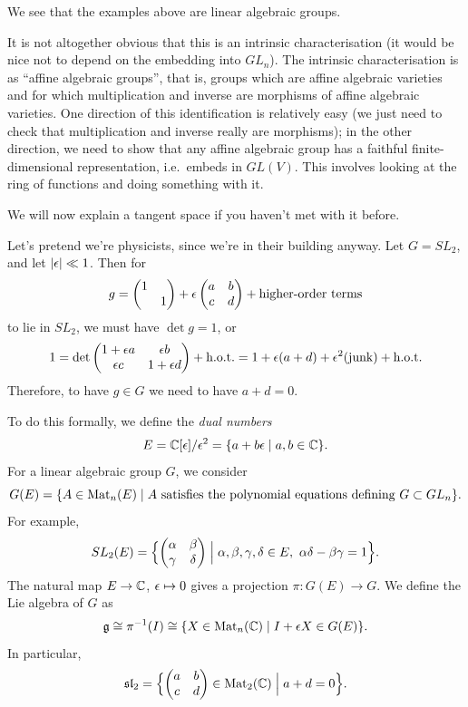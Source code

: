 We see that the examples above are linear algebraic groups.

\begin{remark}
It is not altogether obvious that this is an intrinsic characterisation (it
would be nice not to depend on the embedding into $GL_n$). The intrinsic
characterisation is as ``affine algebraic groups'', that is, groups which are
affine algebraic varieties and for which multiplication and inverse are
morphisms of affine algebraic varieties. One direction of this identification
is relatively easy (we just need to check that multiplication and inverse
really are morphisms); in the other direction, we need to show that any affine
algebraic group has a faithful finite-dimensional representation, i.e.\ embeds
in $GL(V)$. This involves looking at the ring of functions and doing something
with it.
\end{remark}

We will now explain a tangent space if you haven't met with it before.

\begin{example}
Let's pretend we're physicists, since we're in their building anyway. Let
$G = SL_2$, and let $|\epsilon| \ll 1$. Then for
\[
  g = \begin{pmatrix} 1 & \\ & 1 \end{pmatrix}
      + \epsilon \begin{pmatrix} a & b \\ c & d \end{pmatrix}
      + \text{higher-order terms}
\]
to lie in $SL_2$, we must have $\det g = 1$, or
\[
  1 = \det \begin{pmatrix} 1 + \epsilon a & \epsilon b \\ \epsilon c & 1 + \epsilon d \end{pmatrix}
      + \text{h.o.t.}
    = 1 + \epsilon(a + d) + \epsilon^2(\text{junk}) + \text{h.o.t.}
\]
Therefore, to have $g \in G$ we need to have $a + d = 0$.
\end{example}

To do this formally, we define the \emph{dual numbers}
\[
  E = \mathbb{C}[\epsilon]/\epsilon^2 = \{a + b\epsilon \mid a, b \in \mathbb{C}\}.
\]
For a linear algebraic group $G$, we consider
\[
  G(E) = \{A \in \operatorname{Mat}_n(E) \mid A \text{ satisfies the polynomial equations defining } G \subset GL_n\}.
\]
For example,
\[
  SL_2(E) = \Bigl\{ \begin{pmatrix} \alpha & \beta \\ \gamma & \delta \end{pmatrix}
     \Bigm| \alpha, \beta, \gamma, \delta \in E,\ \alpha\delta - \beta\gamma = 1 \Bigr\}.
\]
The natural map $E \to \mathbb{C}$, $\epsilon \mapsto 0$ gives a projection
$\pi\colon G(E) \to G$. We define the Lie algebra of $G$ as
\[
  \mathfrak{g} \cong \pi^{-1}(I) \cong \{X \in \operatorname{Mat}_n(\mathbb{C}) \mid I + \epsilon X \in G(E)\}.
\]
In particular,
\[
  \mathfrak{sl}_2 = \Bigl\{ \begin{pmatrix} a & b \\ c & d \end{pmatrix} \in \operatorname{Mat}_2(\mathbb{C})
     \Bigm| a + d = 0 \Bigr\}.
\]

